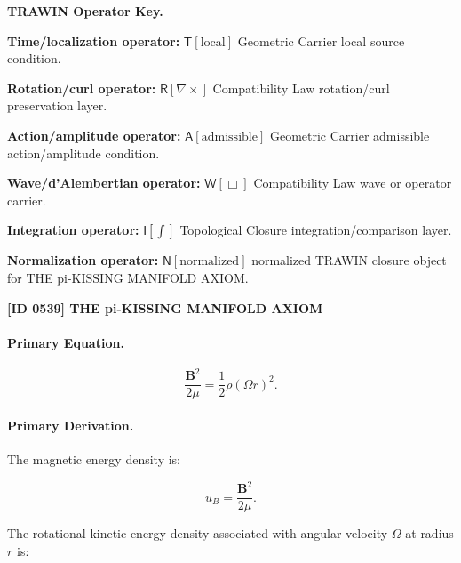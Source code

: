\par\vspace{0.45\baselineskip}
\noindent\begin{minipage}[t]{\linewidth}
\begingroup
\small
\raggedright
\textbf{TRAWIN Operator Key.}\par
\noindent\textbf{Time/localization operator:} $\mathsf{T}\!\left[\mathrm{local}\right]$ Geometric Carrier local source condition.\par
\noindent\textbf{Rotation/curl operator:} $\mathsf{R}\!\left[\nabla\times\right]$ Compatibility Law rotation/curl preservation layer.\par
\noindent\textbf{Action/amplitude operator:} $\mathsf{A}\!\left[\mathrm{admissible}\right]$ Geometric Carrier admissible action/amplitude condition.\par
\noindent\textbf{Wave/d'Alembertian operator:} $\mathsf{W}\!\left[\Box\right]$ Compatibility Law wave or operator carrier.\par
\noindent\textbf{Integration operator:} $\mathsf{I}\!\left[\int\right]$ Topological Closure integration/comparison layer.\par
\noindent\textbf{Normalization operator:} $\mathsf{N}\!\left[\mathrm{normalized}\right]$ normalized TRAWIN closure object for THE pi-KISSING MANIFOLD AXIOM.\par
\endgroup
\end{minipage}

\clearpage
\noindent\textbf{[ID 0539] THE pi-KISSING MANIFOLD AXIOM}\par
\vspace{0.35em}
\paragraph{Primary Equation.}
\begin{equation}
\frac{\mathbf{B}^2}{2\mu}
=
\frac{1}{2}\rho(\Omega r)^2 .
\end{equation}

\paragraph{Primary Derivation.}
The magnetic energy density is:

\begin{equation}
u_B
=
\frac{\mathbf{B}^2}{2\mu}.
\end{equation}

The rotational kinetic energy density associated with angular velocity $\Omega$ at radius $r$ is:

